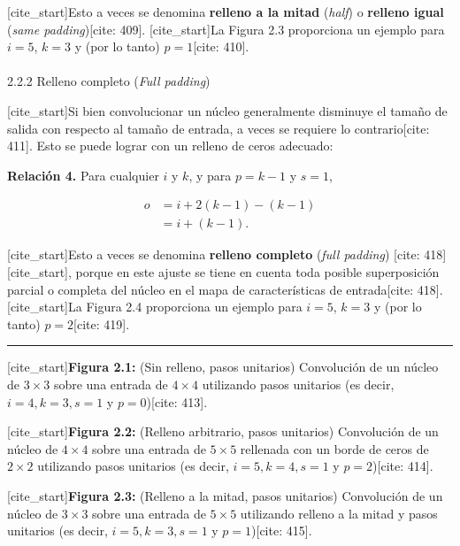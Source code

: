 \documentclass[
  super,
  preprint,
  3p]{elsarticle}
\makeatletter
\let\oldparagraph\paragraph
\renewcommand{\paragraph}{
    \@ifstar
      \xxxParagraphStar
      \xxxParagraphNoStar
  }
\newcommand{\xxxParagraphStar}[1]{\oldparagraph*{#1}\mbox{}}
\newcommand{\xxxParagraphNoStar}[1]{\oldparagraph{#1}\mbox{}}
\makeatother
\begin{document}
{[}cite\_start{]}Esto a veces se denomina \textbf{relleno a la mitad}
(\emph{half}) o \textbf{relleno igual} (\emph{same padding}){[}cite:
409{]}. {[}cite\_start{]}La Figura 2.3 proporciona un ejemplo para
\(i = 5\), \(k = 3\) y (por lo tanto) \(p = 1\){[}cite: 410{]}.

\paragraph{\texorpdfstring{2.2.2 Relleno completo (\emph{Full
padding})}{2.2.2 Relleno completo (Full padding)}}\label{relleno-completo-full-padding}

{[}cite\_start{]}Si bien convolucionar un núcleo generalmente disminuye
el tamaño de salida con respecto al tamaño de entrada, a veces se
requiere lo contrario{[}cite: 411{]}. Esto se puede lograr con un
relleno de ceros adecuado:

\textbf{Relación 4.} Para cualquier \(i\) y \(k\), y para \(p = k - 1\)
y \(s = 1\),

\[
\begin{aligned}
o &= i + 2(k - 1) - (k - 1) \\
&= i + (k - 1).
\end{aligned}
\]

{[}cite\_start{]}Esto a veces se denomina \textbf{relleno completo}
(\emph{full padding}) {[}cite: 418{]}{[}cite\_start{]}, porque en este
ajuste se tiene en cuenta toda posible superposición parcial o completa
del núcleo en el mapa de características de entrada{[}cite: 418{]}.
{[}cite\_start{]}La Figura 2.4 proporciona un ejemplo para \(i = 5\),
\(k = 3\) y (por lo tanto) \(p = 2\){[}cite: 419{]}.

\begin{center}\rule{0.5\linewidth}{0.5pt}\end{center}

{[}cite\_start{]}\textbf{Figura 2.1:} (Sin relleno, pasos unitarios)
Convolución de un núcleo de \(3 \times 3\) sobre una entrada de
\(4 \times 4\) utilizando pasos unitarios (es decir,
\(i = 4, k = 3, s = 1\) y \(p = 0\)){[}cite: 413{]}.

{[}cite\_start{]}\textbf{Figura 2.2:} (Relleno arbitrario, pasos
unitarios) Convolución de un núcleo de \(4 \times 4\) sobre una entrada
de \(5 \times 5\) rellenada con un borde de ceros de \(2 \times 2\)
utilizando pasos unitarios (es decir, \(i = 5, k = 4, s = 1\) y
\(p = 2\)){[}cite: 414{]}.

{[}cite\_start{]}\textbf{Figura 2.3:} (Relleno a la mitad, pasos
unitarios) Convolución de un núcleo de \(3 \times 3\) sobre una entrada
de \(5 \times 5\) utilizando relleno a la mitad y pasos unitarios (es
decir, \(i = 5, k = 3, s = 1\) y \(p = 1\)){[}cite: 415{]}.
\end{document}
